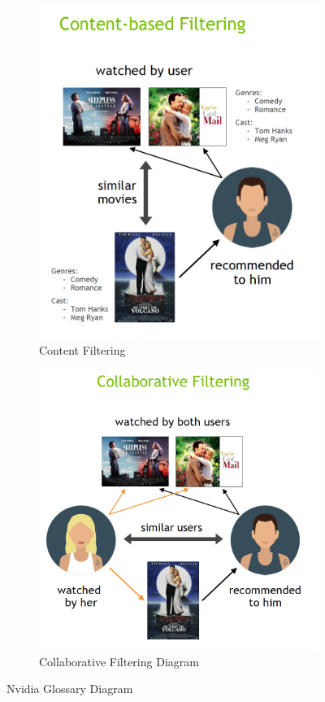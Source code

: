 \begin{figure}[H]
    \centering
    \begin{subfigure}{.5\textwidth}
        \centering
        \includegraphics[width=0.8\linewidth]{assets/content_based_filtering.png}
        \caption{Content Filtering}
        \label{fig:content-filtering}
    \end{subfigure}%
    \begin{subfigure}{.5\textwidth}
        \centering
        \includegraphics[width=0.95\linewidth]{assets/collaborative_filtering.png}
        \caption{Collaborative Filtering Diagram}
        \label{fig:collaborative-filtering}
    \end{subfigure}
    \caption[Nvidia Glossary Diagram]{Nvidia Glossary Diagram~\cite{NvidiaRecSys}}
\end{figure}


